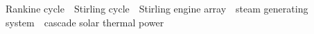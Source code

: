 {%




}
\enkeywords
{Rankine cycle\ ~Stirling cycle\ ~Stirling engine array\ ~steam generating system\ ~cascade solar thermal power}
